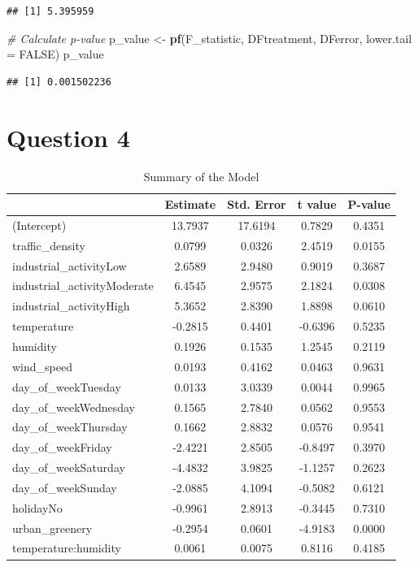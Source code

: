 \documentclass[
]{article}
\newenvironment{Shaded}{\begin{snugshade}}{\end{snugshade}}
\newcommand{\AttributeTok}[1]{\textcolor[rgb]{0.13,0.29,0.53}{#1}}
\newcommand{\CommentTok}[1]{\textcolor[rgb]{0.56,0.35,0.01}{\textit{#1}}}
\newcommand{\ConstantTok}[1]{\textcolor[rgb]{0.56,0.35,0.01}{#1}}
\newcommand{\FunctionTok}[1]{\textcolor[rgb]{0.13,0.29,0.53}{\textbf{#1}}}
\newcommand{\NormalTok}[1]{#1}
\newcommand{\OtherTok}[1]{\textcolor[rgb]{0.56,0.35,0.01}{#1}}
\begin{document}
\begin{verbatim}
## [1] 5.395959
\end{verbatim}

\begin{Shaded}
\begin{Highlighting}[]
\CommentTok{\# Calculate p{-}value}
\NormalTok{p\_value }\OtherTok{\textless{}{-}} \FunctionTok{pf}\NormalTok{(F\_statistic, DFtreatment, DFerror, }\AttributeTok{lower.tail =} \ConstantTok{FALSE}\NormalTok{)}
\NormalTok{p\_value}
\end{Highlighting}
\end{Shaded}

\begin{verbatim}
## [1] 0.001502236
\end{verbatim}

\newpage

\hypertarget{question-4}{%
\section{Question 4}\label{question-4}}

\begingroup\fontsize{12}{14}\selectfont

\begin{longtable}[t]{lcccc}
\caption{\label{tab:unnamed-chunk-6}Summary of the Model}\\
\toprule
 & Estimate & Std. Error & t value & P-value\\
\midrule
(Intercept) & 13.7937 & 17.6194 & 0.7829 & 0.4351\\
traffic\_density & 0.0799 & 0.0326 & 2.4519 & 0.0155\\
industrial\_activityLow & 2.6589 & 2.9480 & 0.9019 & 0.3687\\
industrial\_activityModerate & 6.4545 & 2.9575 & 2.1824 & 0.0308\\
industrial\_activityHigh & 5.3652 & 2.8390 & 1.8898 & 0.0610\\
\addlinespace
temperature & -0.2815 & 0.4401 & -0.6396 & 0.5235\\
humidity & 0.1926 & 0.1535 & 1.2545 & 0.2119\\
wind\_speed & 0.0193 & 0.4162 & 0.0463 & 0.9631\\
day\_of\_weekTuesday & 0.0133 & 3.0339 & 0.0044 & 0.9965\\
day\_of\_weekWednesday & 0.1565 & 2.7840 & 0.0562 & 0.9553\\
\addlinespace
day\_of\_weekThursday & 0.1662 & 2.8832 & 0.0576 & 0.9541\\
day\_of\_weekFriday & -2.4221 & 2.8505 & -0.8497 & 0.3970\\
day\_of\_weekSaturday & -4.4832 & 3.9825 & -1.1257 & 0.2623\\
day\_of\_weekSunday & -2.0885 & 4.1094 & -0.5082 & 0.6121\\
holidayNo & -0.9961 & 2.8913 & -0.3445 & 0.7310\\
\addlinespace
urban\_greenery & -0.2954 & 0.0601 & -4.9183 & 0.0000\\
temperature:humidity & 0.0061 & 0.0075 & 0.8116 & 0.4185\\
\bottomrule
\end{longtable}
\endgroup{}
\end{document}
